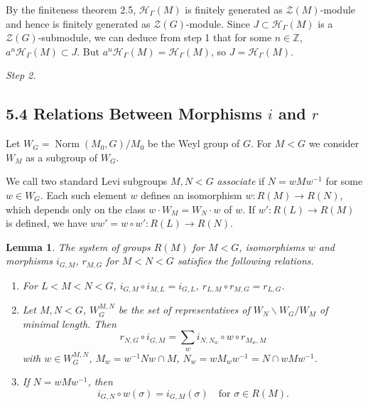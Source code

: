 \documentclass[12pt,a4paper]{article}
\theoremstyle{plain}
\newtheorem{lemma}{Lemma}
\theoremstyle{definition}
\theoremstyle{remark}
\DeclareMathOperator{\Norm}{Norm}
\newcommand{\cH}{\mathscr{H}}
\newcommand{\cZ}{\mathcal{Z}}
\newcommand{\bZ}{\mathbb{Z}}
\begin{document}
By the finiteness theorem 2.5, $\cH_{\Gamma}(M)$ is finitely generated as $\cZ(M)$-module and hence is finitely generated as $\cZ(G)$-module. Since $J \subset \cH_{\Gamma}(M)$ is a $\cZ(G)$-submodule, we can deduce from step 1 that for some $n \in \bZ$, $a^n \cH_{\Gamma}(M) \subset J$. But $a^n \cH_{\Gamma}(M) = \cH_{\Gamma}(M)$, so $J = \cH_{\Gamma}(M)$.

\textit{Step 2.}

\subsection*{5.4 Relations Between Morphisms $i$ and $r$}

Let $W_G = \Norm(M_0, G)/M_0$ be the Weyl group of $G$. For $M < G$ we consider $W_M$ as a subgroup of $W_G$.

We call two standard Levi subgroups $M, N < G$ \emph{associate} if $N = wMw^{-1}$ for some $w \in W_G$. Each such element $w$ defines an isomorphism $w: R(M) \to R(N)$, which depends only on the class $w \cdot W_M = W_N \cdot w$ of $w$. If $w': R(L) \to R(M)$ is defined, we have $ww' = w \circ w': R(L) \to R(N)$.

\begin{lemma}
The system of groups $R(M)$ for $M < G$, isomorphisms $w$ and morphisms $i_{G,M}$, $r_{M,G}$ for $M < N < G$ satisfies the following relations.
\begin{enumerate}[label=(\roman*)]
\item For $L < M < N < G$, $i_{G,M} \circ i_{M,L} = i_{G,L}$, $r_{L,M} \circ r_{M,G} = r_{L,G}$.
\item Let $M, N < G$, $W_{G}^{M,N}$ be the set of representatives of $W_N \backslash W_G / W_M$ of minimal length. Then
\[
r_{N,G} \circ i_{G,M} = \sum_w i_{N,N_w} \circ w \circ r_{M_w,M}
\]
with $w \in W_{G}^{M,N}$, $M_w = w^{-1}Nw \cap M$, $N_w = wM_w w^{-1} = N \cap wMw^{-1}$.
\item If $N = wMw^{-1}$, then
\[
i_{G,N} \circ w(\sigma) = i_{G,M}(\sigma) \quad \text{for } \sigma \in R(M).
\]
\end{enumerate}
\end{lemma}
\end{document}

